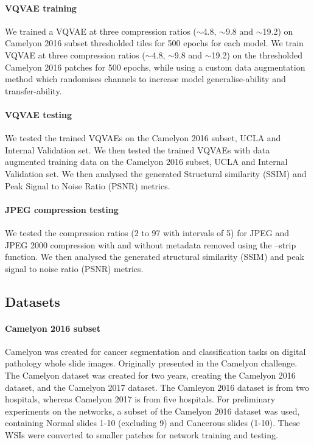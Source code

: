 \documentclass[review]{elsarticle}
\begin{document}
\paragraph{VQVAE training}
We trained a VQVAE at three compression ratios ($\sim$4.8, $\sim$9.8 and $\sim$19.2) on Camelyon 2016 subset thresholded tiles for 500 epochs for each model. We train VQVAE at three compression ratios ($\sim$4.8, $\sim$9.8 and $\sim$19.2) on the thresholded Camelyon 2016 patches for 500 epochs, while using a custom data augmentation method which randomises channels to increase model generalise-ability and transfer-ability.

\paragraph{VQVAE testing}
We tested the trained VQVAEs on the Camelyon 2016 subset, UCLA and Internal Validation set. We then tested the trained VQVAEs with data augmented training data on the Camelyon 2016 subset, UCLA and Internal Validation set. We then analysed the generated Structural similarity (SSIM) and Peak Signal to Noise Ratio (PSNR) metrics.

\paragraph{JPEG compression testing}
We tested the compression ratios (2 to 97 with intervals of 5) for JPEG and JPEG 2000 compression with and without metadata removed using the --strip function. We then analysed the generated structural similarity (SSIM) and peak signal to noise ratio (PSNR) metrics.

\subsection{Datasets}
\paragraph{Camelyon 2016 subset} Camelyon was created for cancer segmentation and classification tasks on digital pathology whole slide images. Originally presented in the Camelyon challenge. The Camelyon dataset was created for two years, creating the Camelyon 2016 dataset, and the Camelyon 2017 dataset. The Camleyon 2016 dataset is from two hospitals, whereas Camelyon 2017 is from five hospitals. For preliminary experiments on the networks, a subset of the Camelyon 2016 dataset was used, containing Normal slides 1-10 (excluding 9) and Cancerous slides (1-10). These WSIs were converted to smaller patches for network training and testing.
\end{document}
